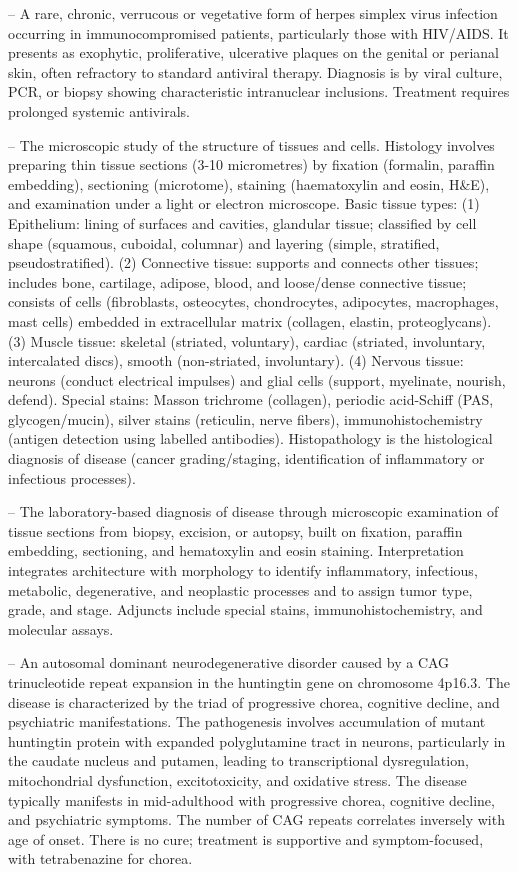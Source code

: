 -- A rare, chronic, verrucous or vegetative form of herpes simplex virus infection occurring in immunocompromised patients, particularly those with HIV/AIDS. It presents as exophytic, proliferative, ulcerative plaques on the genital or perianal skin, often refractory to standard antiviral therapy. Diagnosis is by viral culture, PCR, or biopsy showing characteristic intranuclear inclusions. Treatment requires prolonged systemic antivirals.

-- The microscopic study of the structure of tissues and cells. Histology involves preparing thin tissue sections (3-10 micrometres) by fixation (formalin, paraffin embedding), sectioning (microtome), staining (haematoxylin and eosin, H\&E), and examination under a light or electron microscope. Basic tissue types: (1) Epithelium: lining of surfaces and cavities, glandular tissue; classified by cell shape (squamous, cuboidal, columnar) and layering (simple, stratified, pseudostratified). (2) Connective tissue: supports and connects other tissues; includes bone, cartilage, adipose, blood, and loose/dense connective tissue; consists of cells (fibroblasts, osteocytes, chondrocytes, adipocytes, macrophages, mast cells) embedded in extracellular matrix (collagen, elastin, proteoglycans). (3) Muscle tissue: skeletal (striated, voluntary), cardiac (striated, involuntary, intercalated discs), smooth (non-striated, involuntary). (4) Nervous tissue: neurons (conduct electrical impulses) and glial cells (support, myelinate, nourish, defend). Special stains: Masson trichrome (collagen), periodic acid-Schiff (PAS, glycogen/mucin), silver stains (reticulin, nerve fibers), immunohistochemistry (antigen detection using labelled antibodies). Histopathology is the histological diagnosis of disease (cancer grading/staging, identification of inflammatory or infectious processes).

-- The laboratory-based diagnosis of disease through microscopic examination of tissue sections from biopsy, excision, or autopsy, built on fixation, paraffin embedding, sectioning, and hematoxylin and eosin staining. Interpretation integrates architecture with morphology to identify inflammatory, infectious, metabolic, degenerative, and neoplastic processes and to assign tumor type, grade, and stage. Adjuncts include special stains, immunohistochemistry, and molecular assays.

-- An autosomal dominant neurodegenerative disorder caused by a CAG trinucleotide repeat expansion in the huntingtin gene on chromosome 4p16.3. The disease is characterized by the triad of progressive chorea, cognitive decline, and psychiatric manifestations. The pathogenesis involves accumulation of mutant huntingtin protein with expanded polyglutamine tract in neurons, particularly in the caudate nucleus and putamen, leading to transcriptional dysregulation, mitochondrial dysfunction, excitotoxicity, and oxidative stress. The disease typically manifests in mid-adulthood with progressive chorea, cognitive decline, and psychiatric symptoms. The number of CAG repeats correlates inversely with age of onset. There is no cure; treatment is supportive and symptom-focused, with tetrabenazine for chorea.

